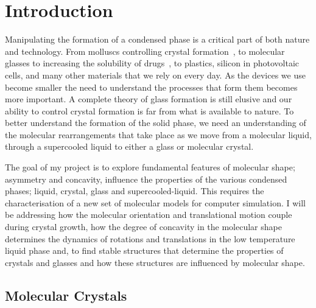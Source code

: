
\chapter{Introduction}


Manipulating the formation of a condensed phase is a critical part of both nature and technology. From molluscs controlling crystal formation~\cite{de-yoreo:03}, to molecular glasses to increasing the solubility of drugs~\cite{hancock:00}, to plastics\tocite, silicon in photovoltaic cells\tocite, and many other materials that we rely on every day. As the devices we use become smaller the need to understand the processes that form them becomes more important. A complete theory of glass formation is still elusive and our ability to control crystal formation is far from what is available to nature. To better understand the formation of the solid phase, we need an understanding of the molecular rearrangements that take place as we move from a molecular liquid, through a supercooled liquid to either a glass or molecular crystal.

The goal of my project is to explore fundamental features of molecular shape; asymmetry and concavity, influence the properties of the various condensed phases; liquid, crystal, glass and supercooled-liquid. This requires the characterisation of a new set of molecular models for computer simulation. I will be addressing how the molecular orientation and translational motion couple during crystal growth, how the degree of concavity in the molecular shape determines the dynamics of rotations and translations in the low temperature liquid phase and, to find stable structures that determine the properties of crystals and glasses and how these structures are influenced by molecular shape.


\section{Molecular Crystals}


